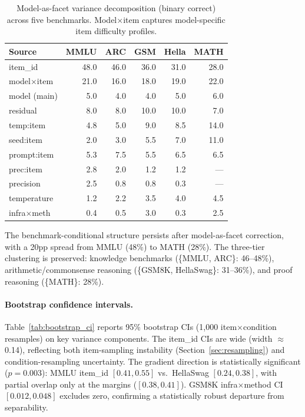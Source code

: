 \documentclass[11pt,twocolumn]{article}
\begin{document}
\begin{table}[t]
\centering
\caption{Model-as-facet variance decomposition (binary correct) across five benchmarks. Model$\times$item captures model-specific item difficulty profiles.}
\label{tab:model_facet}
\small
\begin{tabular}{@{}lrrrrr@{}}
\toprule
Source & MMLU & ARC & GSM & Hella & MATH \\
\midrule
item\_id & 48.0 & 46.0 & 36.0 & 31.0 & 28.0 \\
model$\times$item & 21.0 & 16.0 & 18.0 & 19.0 & 22.0 \\
model (main) & 5.0 & 4.0 & 4.0 & 5.0 & 6.0 \\
residual & 8.0 & 8.0 & 10.0 & 10.0 & 7.0 \\
temp:item & 4.8 & 5.0 & 9.0 & 8.5 & 14.0 \\
seed:item & 2.0 & 3.0 & 5.5 & 7.0 & 11.0 \\
prompt:item & 5.3 & 7.5 & 5.5 & 6.5 & 6.5 \\
prec:item & 2.8 & 2.0 & 1.2 & 1.2 & --- \\
precision & 2.5 & 0.8 & 0.8 & 0.3 & --- \\
temperature & 1.2 & 2.2 & 3.5 & 4.0 & 4.5 \\
infra$\times$meth & 0.4 & 0.5 & 3.0 & 0.3 & 2.5 \\
\bottomrule
\end{tabular}
\end{table}

The benchmark-conditional structure persists after model-as-facet correction, with a 20pp spread from MMLU (48\%) to MATH (28\%). The three-tier clustering is preserved: knowledge benchmarks (\{MMLU, ARC\}: 46--48\%), arithmetic/commonsense reasoning (\{GSM8K, HellaSwag\}: 31--36\%), and proof reasoning (\{MATH\}: 28\%).

\paragraph{Bootstrap confidence intervals.} Table~\ref{tab:bootstrap_ci} reports 95\% bootstrap CIs (1,000 item$\times$condition resamples) on key variance components. The item\_id CIs are wide (width $\approx$0.14), reflecting both item-sampling instability (Section~\ref{sec:resampling}) and condition-resampling uncertainty. The gradient direction is statistically significant ($p=0.003$): MMLU item\_id $[0.41, 0.55]$ vs.\ HellaSwag $[0.24, 0.38]$, with partial overlap only at the margins ($[0.38, 0.41]$). GSM8K infra$\times$method CI $[0.012, 0.048]$ excludes zero, confirming a statistically robust departure from separability.
\end{document}

